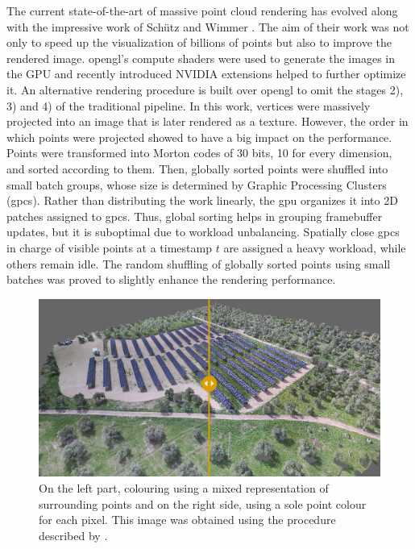 The current state-of-the-art of massive point cloud rendering has evolved along with the impressive work of Schütz and Wimmer \cite{schutz_rendering_2019, schutz_rendering_2021}. The aim of their work was not only to speed up the visualization of billions of points but also to improve the rendered image. \acrshort{opengl}'s compute shaders were used to generate the images in the GPU and recently introduced NVIDIA extensions helped to further optimize it. An alternative rendering procedure is built over \acrshort{opengl} to omit the stages 2), 3) and 4) of the traditional pipeline. In this work, vertices were massively projected into an image that is later rendered as a texture. However, the order in which points were projected showed to have a big impact on the performance. Points were transformed into Morton codes of 30 bits, 10 for every dimension, and sorted according to them. Then, globally sorted points were shuffled into small batch groups, whose size is determined by Graphic Processing Clusters (\acrshort{gpc}s). Rather than distributing the work linearly, the \acrshort{gpu} organizes it into 2D patches assigned to \acrshort{gpc}s. Thus, global sorting helps in grouping framebuffer updates, but it is suboptimal due to workload unbalancing. Spatially close \acrshort{gpc}s in charge of visible points at a timestamp $t$ are assigned a heavy workload, while others remain idle. The random shuffling of globally sorted points using small batches was proved to slightly enhance the rendering performance.

\begin{figure}[ht]
	\includegraphics[width=\textwidth]{figs/fundamentals/hqs_comparison.png}
	\caption{On the left part, colouring using a mixed representation of surrounding points and on the right side, using a sole point colour for each pixel. This image was obtained using the procedure described by \cite{schutz_rendering_2021}. }
    \label{fig:hqs_pc_rendering}
\end{figure}

